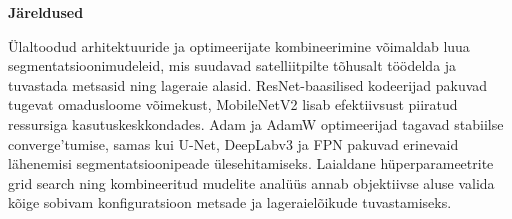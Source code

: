 \textbf{Järeldused}

Ülaltoodud arhitektuuride ja optimeerijate kombineerimine võimaldab luua segmentatsioonimudeleid, mis suudavad satelliitpilte tõhusalt töödelda ja tuvastada metsasid ning lageraie alasid. ResNet-baasilised kodeerijad pakuvad tugevat omadusloome võimekust, MobileNetV2 lisab efektiivsust piiratud ressursiga kasutuskeskkondades. Adam ja AdamW optimeerijad tagavad stabiilse converge’tumise, samas kui U-Net, DeepLabv3 ja FPN pakuvad erinevaid lähenemisi segmentatsioonipeade ülesehitamiseks. Laialdane hüperparameetrite grid search ning kombineeritud mudelite analüüs annab objektiivse aluse valida kõige sobivam konfiguratsioon metsade ja lageraielõikude tuvastamiseks.

